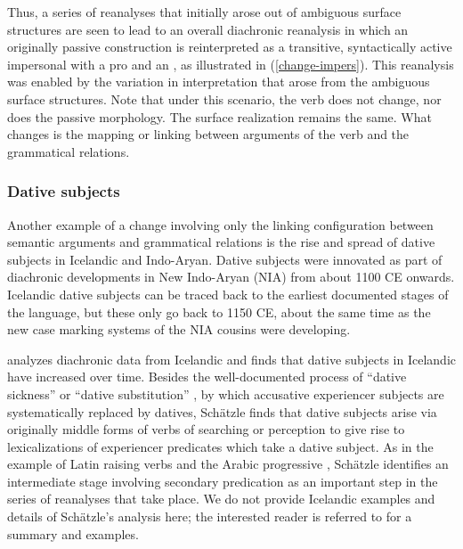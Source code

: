 \documentclass[output=paper,hidelinks]{langscibook}
\begin{document}

Thus, a series of reanalyses that initially arose out of ambiguous surface structures are seen to lead to an overall diachronic reanalysis in which an originally passive construction is reinterpreted as a transitive, syntactically active impersonal with a {\sc pro} \SUBJ and an \OBJ, as illustrated in (\ref{change-impers}).  This reanalysis was enabled by the variation in interpretation that arose from the ambiguous surface structures. 
Note that under this scenario, the verb does not change, nor does the passive morphology. The surface realization remains the same. What changes is the mapping or linking between arguments of the verb and the grammatical relations. 

\subsubsection{Dative subjects}

Another example of a change involving only the linking configuration between semantic arguments and grammatical relations is the rise and spread of dative subjects in Icelandic and Indo-Aryan.  Dative subjects were innovated as part of diachronic developments in New Indo-Aryan (NIA) from about 1100 CE onwards.  Icelandic dative subjects can be traced back to the earliest documented stages of the language, but these only go back to 1150 CE, about the same time as the new case marking systems of the NIA cousins were developing. 

\citet{schaetzle18} analyzes diachronic data from Icelandic and finds that dative subjects in Icelandic have increased over time.  Besides the well-documented process of ``dative sickness'' or ``dative substitution'' \citep{smith96,jonsson03,bardhdal11}, by which accusative experiencer subjects are systematically replaced by datives, Sch\"{a}tzle finds that dative subjects arise via originally middle forms of verbs of searching or perception to give rise to lexicalizations of experiencer predicates which take a dative subject. As in the example of Latin raising verbs \citep{barron2001} and the Arabic progressive \citep{camilleri2020grammaticalisation}, Sch\"{a}tzle identifies an intermediate stage involving secondary predication as an important step in the series of reanalyses that take place.  We do not provide Icelandic examples and details  of Sch\"{a}tzle's analysis here; the interested reader is referred  to  for a summary and examples. 
\end{document}
